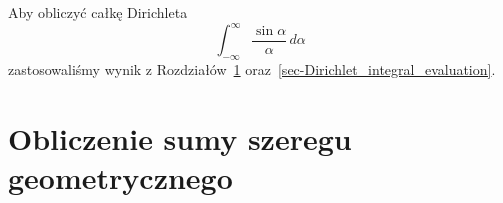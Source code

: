 Aby obliczyć całkę Dirichleta
\[
\int_{-\infty}^{\infty} \frac{\sin \alpha}{\alpha} \, d\alpha
\]
zastosowaliśmy wynik z Rozdziałów~\ref{sec-Geometric_series_evaluation} oraz~\ref{sec-Dirichlet_integral_evaluation}\@.



\section{Obliczenie sumy szeregu geometrycznego}
\label{sec-Geometric_series_evaluation}



